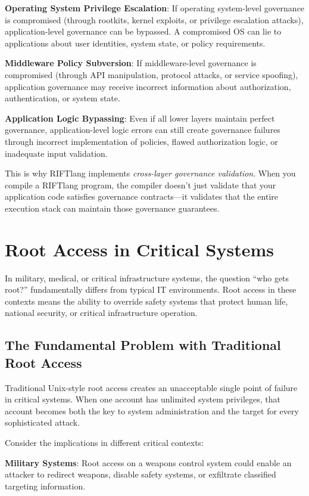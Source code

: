 \textbf{Operating System Privilege Escalation}: If operating system-level governance is compromised (through rootkits, kernel exploits, or privilege escalation attacks), application-level governance can be bypassed. A compromised OS can lie to applications about user identities, system state, or policy requirements.

\textbf{Middleware Policy Subversion}: If middleware-level governance is compromised (through API manipulation, protocol attacks, or service spoofing), application governance may receive incorrect information about authorization, authentication, or system state.

\textbf{Application Logic Bypassing}: Even if all lower layers maintain perfect governance, application-level logic errors can still create governance failures through incorrect implementation of policies, flawed authorization logic, or inadequate input validation.

This is why RIFTlang implements \textit{cross-layer governance validation}. When you compile a RIFTlang program, the compiler doesn't just validate that your application code satisfies governance contracts—it validates that the entire execution stack can maintain those governance guarantees.

\section{Root Access in Critical Systems}

In military, medical, or critical infrastructure systems, the question ``who gets root?'' fundamentally differs from typical IT environments. Root access in these contexts means the ability to override safety systems that protect human life, national security, or critical infrastructure operation.

\subsection{The Fundamental Problem with Traditional Root Access}

Traditional Unix-style root access creates an unacceptable single point of failure in critical systems. When one account has unlimited system privileges, that account becomes both the key to system administration and the target for every sophisticated attack.

Consider the implications in different critical contexts:

\textbf{Military Systems}: Root access on a weapons control system could enable an attacker to redirect weapons, disable safety systems, or exfiltrate classified targeting information.

